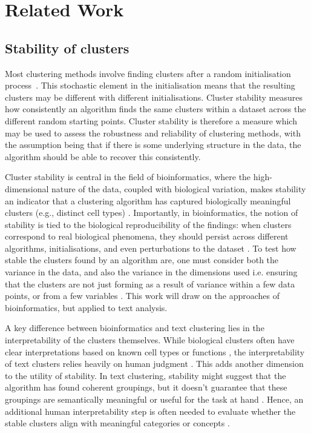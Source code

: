 \section{Related Work}
\subsection*{Stability of clusters}
Most clustering methods involve finding clusters after a random initialisation process~\cite{ahmedKmeansAlgorithmComprehensive2020, hosseiniAlternativeEMGaussian2020}.  
This stochastic element in the initialisation means that the resulting clusters may be different with different initialisations. Cluster stability measures how consistently an algorithm finds the same clusters within a dataset across the different random starting points.  Cluster stability is therefore a measure which may be used to assess the robustness and reliability of clustering methods, with the assumption being that if there is some underlying structure in the data, the algorithm should be able to recover this consistently.  




Cluster stability is central in the field of bioinformatics, where the high-dimensional nature of the data, coupled with biological variation, makes stability an indicator that a clustering algorithm has captured biologically meaningful clusters (e.g., distinct cell types) \cite{kiselevChallengesUnsupervisedClustering2019}. 
Importantly, in bioinformatics, the notion of stability is tied to the biological reproducibility of the findings: when clusters correspond to real biological phenomena, they should persist across different algorithms, initialisations, and even perturbations to the dataset \cite{handlComputationalClusterValidation2005, ronanAvoidingCommonPitfalls2016}. To test how stable the clusters found by an algorithm are, one must consider both the variance in the data, and also the variance in the dimensions used i.e. ensuring that the clusters are not just forming as a result of variance within a few data points, or from a few variables \cite{yu2022benchmarking}.  This work will draw on the approaches of bioinformatics, but applied to text analysis.


A key difference between bioinformatics and text clustering lies in the interpretability of the clusters themselves. While biological clusters often have clear interpretations based on known cell types or functions \cite{qiClusteringClassificationMethods2020}, the interpretability of text clusters relies heavily on human judgment \cite{JMLR:v18:17-069}. 
This adds another dimension to the utility of stability. In text clustering, stability might suggest that the algorithm has found coherent groupings, but it doesn’t guarantee that these groupings are semantically meaningful or useful for the task at hand \cite{ahmedKmeansAlgorithmComprehensive2020}. Hence, an additional human interpretability step is often needed to evaluate whether the stable clusters align with meaningful categories or concepts \cite{kuncheva2006evaluation}.




